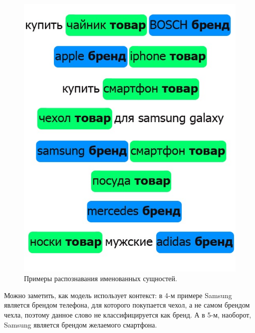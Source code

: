 \documentclass[12pt,a4paper]{article}
\begin{document}
\begin{figure}[H]
	\begin{center}
		\includegraphics[scale=0.7]{ner2.jpg}
	\end{center}
	\caption{Примеры распознавания именованных сущностей.}
\end{figure}

\noindent Можно заметить, как модель использует контекст: в 4-м примере Samsung является брендом телефона, для которого покупается чехол, а не самом брендом чехла, поэтому данное слово не классифицируется как бренд. А в 5-м, наоборот, Samsung является брендом желаемого смартфона.
\end{document}
